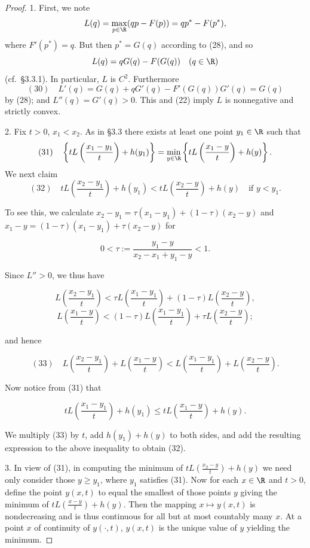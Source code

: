 \begin{proof}
1. First, we note
$$L(q) = \max_{p \in \R} (qp - F(p)) = qp^* - F(p^*),$$
where $F'(p^*) = q$. But then $p^* = G(q)$ according to (28), and so
$$L(q) = qG(q) - F(G(q)) \quad (q \in \R)$$
(cf.\ \S 3.3.1). In particular, $L$ is $C^2$. Furthermore
$$(30) \quad L'(q) = G(q) + qG'(q) - F'(G(q))G'(q) = G(q)$$
by (28); and $L''(q) = G'(q) > 0$. This and (22) imply $L$ is nonnegative and strictly convex.

2. Fix $t > 0$, $x_1 < x_2$. As in \S 3.3 there exists at least one point $y_1 \in \R$ such that
$$(31) \quad \left\{tL\left(\frac{x_1-y_1}{t}\right) + h(y_1)\right\} = \min_{y \in \R}\left\{tL\left(\frac{x_1-y}{t}\right) + h(y)\right\}.$$
We next claim
$$(32) \quad tL\left(\frac{x_2-y_1}{t}\right) + h(y_1) < tL\left(\frac{x_2-y}{t}\right) + h(y) \quad \text{if } y < y_1.$$

To see this, we calculate $x_2 - y_1 = \tau(x_1 - y_1) + (1-\tau)(x_2 - y)$ and $x_1 - y = (1-\tau)(x_1 - y_1) + \tau(x_2 - y)$ for

$$0 < \tau := \frac{y_1 - y}{x_2 - x_1 + y_1 - y} < 1.$$

Since $L'' > 0$, we thus have

$$L\left(\frac{x_2-y_1}{t}\right) < \tau L\left(\frac{x_1-y_1}{t}\right) + (1-\tau)L\left(\frac{x_2-y}{t}\right),$$
$$L\left(\frac{x_1-y}{t}\right) < (1-\tau)L\left(\frac{x_1-y_1}{t}\right) + \tau L\left(\frac{x_2-y}{t}\right);$$

and hence

$$(33) \quad L\left(\frac{x_2-y_1}{t}\right) + L\left(\frac{x_1-y}{t}\right) < L\left(\frac{x_1-y_1}{t}\right) + L\left(\frac{x_2-y}{t}\right).$$

Now notice from (31) that

$$tL\left(\frac{x_1-y_1}{t}\right) + h(y_1) \le tL\left(\frac{x_1-y}{t}\right) + h(y).$$

We multiply (33) by $t$, add $h(y_1) + h(y)$ to both sides, and add the resulting expression to the above inequality to obtain (32).

3. In view of (31), in computing the minimum of $tL\left(\frac{x_2-y}{t}\right) + h(y)$ we need only consider those $y \ge y_1$, where $y_1$ satisfies (31). Now for each $x \in \R$ and $t > 0$, define the point $y(x,t)$ to equal the smallest of those points $y$ giving the minimum of $tL\left(\frac{x-y}{t}\right) + h(y)$. Then the mapping $x \mapsto y(x,t)$ is nondecreasing and is thus continuous for all but at most countably many $x$. At a point $x$ of continuity of $y(\cdot,t)$, $y(x,t)$ is the unique value of $y$ yielding the minimum.


\end{proof}
